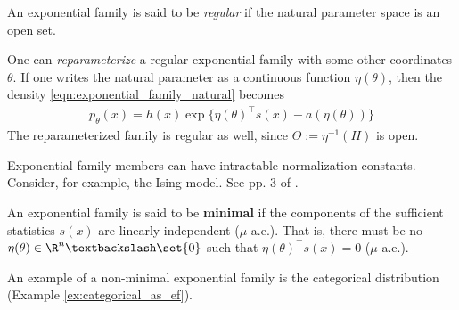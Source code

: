 \documentclass{article} %
\newcommand{\logNormalizerFunction}{a}
\newcommand{\sufficientStatsFunction}{s}
\newcommand{\carrierDensity}{h}
\newcommand{\naturalParamSpace}{H}
\begin{document}
\begin{definition}
An exponential family is said to be \textit{regular} if the natural parameter space is an open set.
\end{definition}

One can \textit{reparameterize} a regular exponential family with some other coordinates $\theta$.  If one writes the natural parameter as a continuous function $\eta(\theta)$, then the density \eqref{eqn:exponential_family_natural} becomes
\begin{align}
\label{eqn:exponential_family}
 p_\theta(x) = \carrierDensity(x) \exp \{ \eta(\theta)^\top \sufficientStatsFunction(x) - \logNormalizerFunction(\eta(\theta))\} 
 \end{align}
 The reparameterized family is regular as well, since $\Theta := \eta^{-1}(\naturalParamSpace)$ is open. 


\begin{remark}
Exponential family members can have intractable normalization constants.  Consider, for example,  the Ising model.  See pp. 3 of \cite{taylor2013multiparameter}.
\end{remark}


\begin{definition}
An exponential family is said to be \textbf{minimal} if the components of the sufficient statistics $\sufficientStatsFunction(x)$ are linearly independent ($\mu$-a.e.).  That is, there must be no $\eta(\theta) \in \R^n \textbackslash \set{0}$ such that $\eta(\theta)^\top \sufficientStatsFunction(x) = 0$ ($\mu$-a.e.).
\label{def:minimal_exponential_families}
\end{definition}

  An example of a non-minimal exponential family is the categorical distribution (Example \ref{ex:categorical_as_ef}). 

\end{document}
